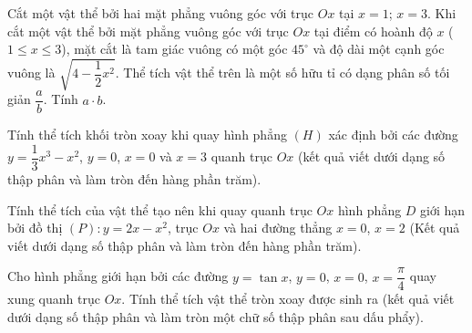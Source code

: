 	\begin{ex}%
	Cắt một vật thể bởi hai mặt phẳng vuông góc với trục $Ox$ tại $x=1$; $x=3$. Khi cắt một vật thể bởi mặt phẳng vuông góc với trục $Ox$ tại điểm có hoành độ $x$ ($1\le x\le 3$), mặt cắt là tam giác vuông có một góc $45^\circ$ và độ dài một cạnh góc vuông là $\sqrt{4-\dfrac{1}{2} x^2}$. Thể tích vật thể trên là một số hữu tỉ có dạng phân số tối giản $\dfrac{a}{b}$. Tính $a\cdot b$.
\end{ex}

\begin{ex}%
Tính thể tích khối tròn xoay khi quay hình phẳng $(H)$ xác định bởi các đường $y=\dfrac{1}{3}x^3-x^2$, $y=0$, $x=0$ và $x=3$ quanh trục $Ox$ (kết quả viết dưới dạng số thập phân và làm tròn đến hàng phần trăm).
\end{ex}

\begin{ex}%
Tính thể tích của vật thể tạo nên khi quay quanh trục $Ox$ hình phẳng $D$ giới hạn bởi đồ thị $(P)\colon y=2x-x^2$, trục $Ox$ và hai đường thẳng $x=0$, $x=2$ (Kết quả viết dưới dạng số thập phân và làm tròn đến hàng phần trăm).
\end{ex}

\begin{ex}%
Cho hình phẳng giới hạn bởi các đường $y=\tan x$, $y=0$, $x=0$, $x=\dfrac{\pi}{4}$ quay xung quanh trục $Ox$. Tính thể tích vật thể tròn xoay được sinh ra (kết quả viết dưới dạng số thập phân và làm tròn một chữ số thập phân sau dấu phẩy).
\end{ex}

